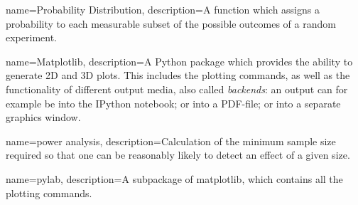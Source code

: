 \makeglossaries

{
        name=Probability Distribution,
        description={A function which assigns a probability to each measurable subset of the possible outcomes of a random experiment.}
}

{
        name=Matplotlib,
        description={A Python package which provides the ability to generate 2D and 3D plots. This includes the plotting commands, as well as the functionality of different output media, also called \emph{backends}: an output can for example be into the IPython notebook; or into a PDF-file; or into a separate graphics window.}
}

{
        name=power analysis,
        description={Calculation of the minimum sample size required so that one can be reasonably likely to detect an effect of a given size.}
}

{
        name=pylab,
        description={A subpackage of \gls{matplotlib}, which contains all the plotting commands.}
}














